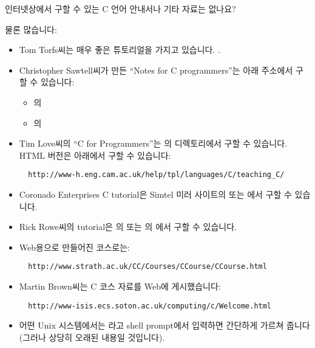 \begin{faq}
	인터넷상에서 구할 수 있는 C 언어 안내서나 기타 자료는 없나요?

\A
	물론 많습니다:

	\begin{itemize}
	\item Tom Torfs씨는 매우 좋은 튜토리얼을 가지고 있습니다.  \break
	.

	\item Christopher Sawtell씨가 만든 ``Notes for C programmers''는
	아래 주소에서 구할 수 있습니다:
\begin{itemize}
\item {}의 
\item {}의 
\end{itemize}

	\item Tim Love씨의 ``C for Programmers''는 의
	 디렉토리에서 구할 수 있습니다.  HTML 버전은 아래에서
	구할 수 있습니다:
\begin{verbatim}
  http://www-h.eng.cam.ac.uk/help/tpl/languages/C/teaching_C/
\end{verbatim}

	\item Coronado Enterprises C tutorial은 Simtel 미러 사이트의
	 또는 에서
	구할 수 있습니다.

	\item Rick Rowe씨의 tutorial은 의 
	 또는 의
	에서
	구할 수 있습니다.

	\item Web용으로 만들어진 코스로는:
\begin{verbatim}
  http://www.strath.ac.uk/CC/Courses/CCourse/CCourse.html
\end{verbatim}

	\item Martin Brown씨는 C 코스 자료를 Web에 게시했습니다:
\begin{verbatim}
  http://www-isis.ecs.soton.ac.uk/computing/c/Welcome.html
\end{verbatim}

	\item 어떤 Unix 시스템에서는 라고 shell prompt에서
	입력하면 간단하게 가르쳐 줍니다 (그러나 상당히 오래된 내용일 것입니다).


\end{itemize}
\end{faq}
